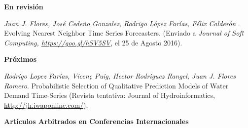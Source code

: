 \documentclass[10pt]{article}
\newenvironment{innerlist}[1][\enskip\textbullet]%
        {\begin{compactitem}[#1]}{\end{compactitem}}
\newcommand{\blankline}{\quad\pagebreak[2]}
\begin{document}
\textbf{En revisión}
\begin{innerlist}
\item \textit{Juan J. Flores, José Cede\~no Gonzalez, Rodrigo López Farías, Félix Calderón }.  Evolving Nearest Neighbor Time Series Forecasters. (Enviado a \textit{Journal of Soft Computing, \url{https://goo.gl/hSV5SV}}, el 25 de Agosto 2016).
\end{innerlist}



\textbf{Próximos}
\begin{innerlist}
\item \textit{Rodrigo Lopez Farías, Vicen\c{c} Puig, Hector Rodriguez Rangel, Juan J. Flores Romero}.  Probabilistic Selection of Qualitative Prediction Models of Water Demand Time-Series (Revista tentativa: Journal of Hydroinformatics, \url{http://jh.iwaponline.com/}).
\end{innerlist}

\blankline



\textbf{Artículos Arbitrados en Conferencias Internacionales}
\end{document}
